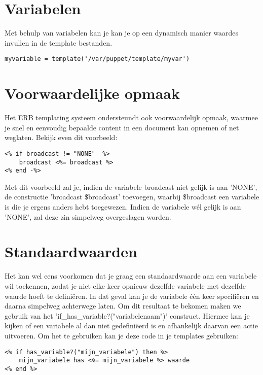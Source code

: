 \section{Variabelen}
Met behulp van variabelen kan je kan je op een dynamisch manier waardes invullen in de template bestanden.
%
\begin{code}
\begin{lstlisting}
myvariable = template('/var/puppet/template/myvar')
\end{lstlisting}
\end{code}
%
\section{Voorwaardelijke opmaak}
%
Het ERB templating systeem ondersteundt ook voorwaardelijk opmaak, waarmee je snel en eenvoudig bepaalde content in een document kan opnemen of net weglaten. Bekijk even dit voorbeeld:
\begin{code}
\begin{lstlisting}
<% if broadcast != "NONE" -%>
	broadcast <%= broadcast %>
<% end -%>
\end{lstlisting}
\end{code}
%
Met dit voorbeeld zal je, indien de variabele broadcast niet gelijk is aan 'NONE', de constructie 'broadcast \$broadcast' toevoegen, waarbij \$broadcast een variabele is die je ergens anders hebt toegewezen. Indien de variabele w\'{e}l gelijk is aan 'NONE', zal deze zin simpelweg overgeslagen worden.
%
\section{Standaardwaarden}
Het kan wel eens voorkomen dat je graag een standaardwaarde aan een variabele wil toekennen, zodat je niet elke keer opnieuw dezelfde variabele met dezelfde waarde hoeft te defini\"eren. In dat geval kan je de variabele \'e\'en keer specifi\"eren en daarna simpelweg achterwege laten. Om dit resultaat te bekomen maken we gebruik van het 'if\_has\_variable?("variabelenaam")' construct. Hiermee kan je kijken of een variabele al dan niet gedefini\"eerd is en afhankelijk daarvan een actie uitvoeren. Om het te gebruiken kan je deze code in je templates gebruiken:
%
\begin{code}
\begin{lstlisting}
<% if has_variable?("mijn_variabele") then %>
	mijn_variabele has <%= mijn_variabele %> waarde
<% end %>
\end{lstlisting}
\end{code}
%
